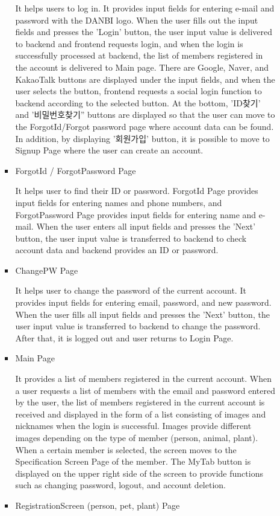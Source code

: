 \documentclass[conference]{IEEEtran}
\begin{document}
\begin{itemize}
\begin{enumerate}
\begin{itemize}
            It helps users to log in. It provides input fields for entering e-mail and password with the DANBI logo. When the user fills out the input fields and presses the 'Login' button, the user input value is delivered to backend and frontend requests login, and when the login is successfully processed at backend, the list of members registered in the account is delivered to Main page. There are Google, Naver, and KakaoTalk buttons are displayed under the input fields, and when the user selects the button, frontend requests a social login function to backend according to the selected button. At the bottom, 'ID찾기' and '비밀번호찾기'' buttons are displayed so that the user can move to the ForgotId/Forgot password page where account data can be found. In addition, by displaying '회원가입' button, it is possible to move to Signup Page where the user can create an account.
            \item ForgotId / ForgotPassword Page
            \setlength{\parindent}{2ex}
            
            It helps user to find their ID or password. ForgotId Page provides input fields for entering names and phone numbers, and ForgotPassword Page provides input fields for entering name and e-mail. When the user enters all input fields and presses the 'Next' button, the user input value is transferred to backend to check account data and backend provides an ID or password.
            \item ChangePW Page
            \setlength{\parindent}{2ex}
            
            It helps user to change the password of the current account. It provides input fields for entering email, password, and new password. When the user fills all input fields and presses the 'Next' button, the user input value is transferred to backend to change the password. After that, it is logged out and user returns to Login Page.
            \item Main Page
            \setlength{\parindent}{2ex}
            
            It provides a list of members registered in the current account. When a user requests a list of members with the email and password entered by the user, the list of members registered in the current account is received and displayed in the form of a list consisting of images and nicknames when the login is successful. Images provide different images depending on the type of member (person, animal, plant). When a certain member is selected, the screen moves to the Specification Screen Page of the member. The MyTab button is displayed on the upper right side of the screen to provide functions such as changing password, logout, and account deletion.
            \item RegistrationScreen (person, pet, plant) Page
            \setlength{\parindent}{2ex}
            

\end{itemize}
\end{enumerate}
\end{itemize}
\end{document}
